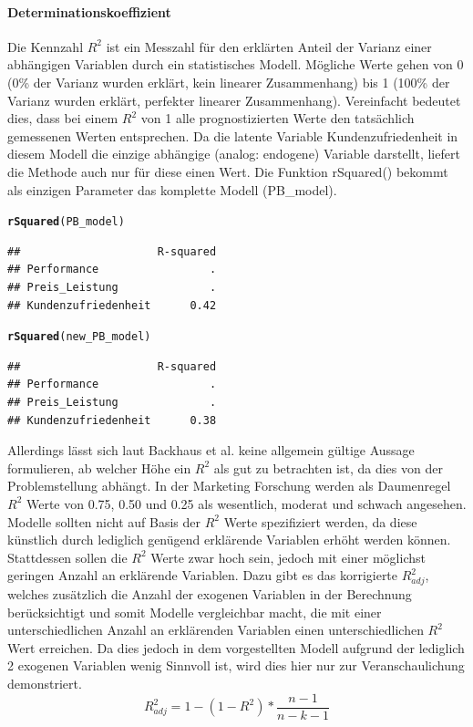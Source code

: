 \documentclass{article}\usepackage[]{graphicx}\usepackage[]{color}
\makeatletter
\newcommand{\hlstd}[1]{\textcolor[rgb]{0.345,0.345,0.345}{#1}}%
\newcommand{\hlkwd}[1]{\textcolor[rgb]{0.737,0.353,0.396}{\textbf{#1}}}%
\newenvironment{kframe}{%
 \def\at@end@of@kframe{}%
 \ifinner\ifhmode%
  \def\at@end@of@kframe{\end{minipage}}%
  \begin{minipage}{\columnwidth}%
 \fi\fi%
 \def\FrameCommand##1{\hskip\@totalleftmargin \hskip-\fboxsep
 \colorbox{shadecolor}{##1}\hskip-\fboxsep
     \hskip-\linewidth \hskip-\@totalleftmargin \hskip\columnwidth}%
 \MakeFramed {\advance\hsize-\width
   \@totalleftmargin\z@ \linewidth\hsize
   \@setminipage}}%
 {\par\unskip\endMakeFramed%
 \at@end@of@kframe}
\newenvironment{knitrout}{}{} %
\makeatother
\begin{document}
\paragraph{Determinationskoeffizient}

Die Kennzahl $R^2$ ist ein Messzahl für den erklärten Anteil der Varianz einer abhängigen Variablen durch ein statistisches Modell. Mögliche Werte gehen von 0 (0\% der Varianz wurden erklärt, kein linearer Zusammenhang) bis 1 (100\% der Varianz wurden erklärt, perfekter linearer Zusammenhang). Vereinfacht bedeutet dies, dass bei einem $R^2$ von 1 alle prognostizierten Werte den tatsächlich gemessenen Werten entsprechen. Da die latente Variable Kundenzufriedenheit in diesem Modell die einzige abhängige (analog: endogene) Variable darstellt, liefert die Methode auch nur für diese einen Wert. Die Funktion rSquared() bekommt als einzigen Parameter das komplette Modell (PB\_model).
\begin{knitrout}
\color{fgcolor}\begin{kframe}
\begin{alltt}
\hlkwd{rSquared}\hlstd{(PB_model)}
\end{alltt}
\begin{verbatim}
##                     R-squared
## Performance                 .
## Preis_Leistung              .
## Kundenzufriedenheit      0.42
\end{verbatim}
\begin{alltt}
\hlkwd{rSquared}\hlstd{(new_PB_model)}
\end{alltt}
\begin{verbatim}
##                     R-squared
## Performance                 .
## Preis_Leistung              .
## Kundenzufriedenheit      0.38
\end{verbatim}
\end{kframe}
\end{knitrout}
Allerdings lässt sich laut Backhaus et al.\cite{backhaus2004industriegutermarketing} keine allgemein gültige Aussage formulieren, ab welcher Höhe ein $R^{2}$ als gut zu betrachten ist, da dies von der Problemstellung abhängt. In der Marketing Forschung werden als Daumenregel $R^{2}$ Werte von 0.75, 0.50 und 0.25 als wesentlich, moderat und schwach angesehen.\cite{hair2011pls,henseler2009use} Modelle sollten nicht auf Basis der $R^{2}$ Werte spezifiziert werden, da diese künstlich durch lediglich genügend erklärende Variablen erhöht werden können. Stattdessen sollen die $R^{2}$ Werte zwar hoch sein, jedoch mit einer möglichst geringen Anzahl an erklärende Variablen. Dazu gibt es das korrigierte $R^{2}_{adj}$, welches zusätzlich die Anzahl der exogenen Variablen in der Berechnung berücksichtigt und somit Modelle vergleichbar macht, die mit einer unterschiedlichen Anzahl an erklärenden Variablen einen unterschiedlichen $R^{2}$ Wert erreichen. Da dies jedoch in dem vorgestellten Modell aufgrund der lediglich 2 exogenen Variablen wenig Sinnvoll ist, wird dies hier nur zur Veranschaulichung demonstriert. 
\begin{equation}
 R^{2}_{adj} = 1-(1-R^{2})*\frac{n-1}{n-k-1}
\end{equation}
\end{document}
